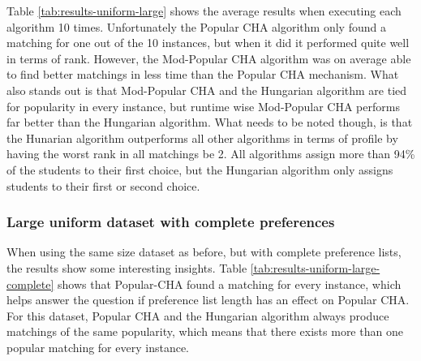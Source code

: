 \begin{table}[h!]
  \centering
  \caption{Average results for large uniform dataset with incomplete preferences.}
  \label{tab:results-uniform-large}
\end{table}

Table \ref{tab:results-uniform-large} shows the average results when executing each algorithm 10 times. Unfortunately the Popular CHA algorithm only found a matching for one out of the 10 instances, but when it did it performed quite well in terms of rank. However, the Mod-Popular CHA algorithm was on average able to find better matchings in less time than the Popular CHA mechanism. What also stands out is that Mod-Popular CHA and the Hungarian algorithm are tied for popularity in every instance, but runtime wise Mod-Popular CHA performs far better than the Hungarian algorithm. What needs to be noted though, is that the Hunarian algorithm outperforms all other algorithms in terms of profile by having the worst rank in all matchings be 2. All algorithms assign more than 94\% of the students to their first choice, but the Hungarian algorithm only assigns students to their first or second choice.  

\subsubsection{Large uniform dataset with complete preferences}
When using the same size dataset as before, but with complete preference lists, the results show some interesting insights. Table \ref{tab:results-uniform-large-complete} shows that Popular-CHA found a matching for every instance, which helps answer the question if preference list length has an effect on Popular CHA. For this dataset, Popular CHA and the Hungarian algorithm always produce matchings of the same popularity, which means that there exists more than one popular matching for every instance. 

